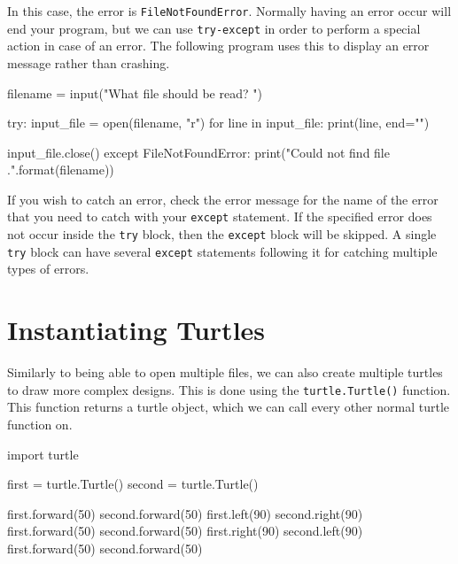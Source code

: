 \documentclass[11pt]{cselabheader}
\begin{document}

In this case, the error is \lstinline{FileNotFoundError}. Normally having an
error occur will end your program, but we can use \lstinline{try-except} in
order to perform a special action in case of an error. The following program
uses this to display an error message rather than crashing.

\begin{python3code}
filename = input("What file should be read? ")

try:
  input_file = open(filename, "r")
  for line in input_file:
    print(line, end="")

  input_file.close()
except FileNotFoundError:
  print("Could not find file {}.".format(filename))
\end{python3code}

If you wish to catch an error, check the error message for the name of the error
that you need to catch with your \lstinline{except} statement. If the specified
error does not occur inside the \lstinline{try} block, then the
\lstinline{except} block will be skipped. A single \lstinline{try} block can
have several \lstinline{except} statements following it for catching multiple
types of errors.

\pagebreak
\section{Instantiating Turtles}
Similarly to being able to open multiple files, we can also create multiple
turtles to draw more complex designs. This is done using the
\lstinline{turtle.Turtle()} function. This function returns a turtle object,
which we can call every other normal turtle function on.

\begin{python3code}
import turtle

first = turtle.Turtle()
second = turtle.Turtle()

first.forward(50)
second.forward(50)
first.left(90)
second.right(90)
first.forward(50)
second.forward(50)
first.right(90)
second.left(90)
first.forward(50)
second.forward(50)
\end{python3code}
\end{document}
